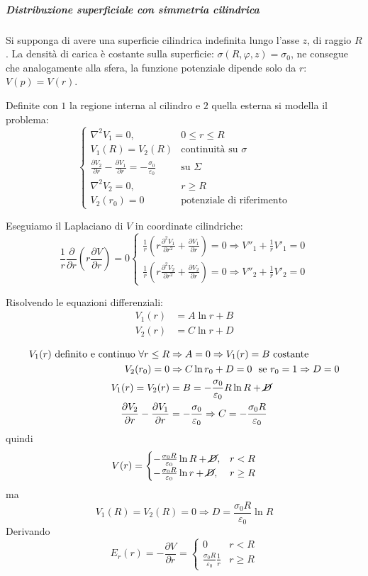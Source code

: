 \newpage
\subparagraph{Distribuzione superficiale con simmetria cilindrica}
Si supponga di avere una superficie cilindrica indefinita lungo l'asse $z$, di raggio $R$.
La densità di carica è costante sulla superficie: $\sigma(R,\varphi,z) = \sigma_0$, ne consegue che
analogamente alla sfera, la funzione potenziale dipende solo da $r$: $V(p)=V(r)$.

Definite con $1$ la regione interna al cilindro e $2$ quella esterna si modella il problema:
$$
\begin{cases}
\nabla^2 V_1 = 0, & 0\leq r\leq R\\
V_1(R) = V_2(R) & \text{continuità su }\sigma \\
\frac{\partial V_2}{\partial r} - \frac{\partial V_1}{\partial r} = -\frac{\sigma_0}{\varepsilon_0} & \text{su } \Sigma\\
\nabla^2 V_2 = 0, & r\geq R\\
V_2(r_0) = 0 & \text{potenziale di riferimento}
\end{cases}
$$

Eseguiamo il Laplaciano di $V$ in coordinate cilindriche:
$$
\frac{1}{r}\frac{\partial}{\partial r} \left(r\frac{\partial V}{\partial r}\right) = 0 \begin{cases}
\frac{1}{r}\left(r \frac{\partial^2 V_1}{\partial r^2} + 
\frac{\partial V_1}{\partial r}\right) = 0\Rightarrow V''_1 + 
\frac{1}{r}V'_1 = 0\\
\frac{1}{r}\left(r \frac{\partial^2 V_2}{\partial r^2} + 
\frac{\partial V_2}{\partial r}\right) = 0\Rightarrow V''_2 + 
\frac{1}{r}V'_2 = 0
\end{cases}
$$

Risolvendo le equazioni differenziali:
\begin{align*}
V_1(r) &= A \ln r + B\\
V_2(r) &= C \ln r + D
\end{align*}

\begin{align*}
V_1(r) \text{ definito e continuo } 
\forall r\leq R & \Rightarrow A = 0 \Rightarrow V_1(r) = B 
\text{ costante}\\
V_2(r_0) = 0 &\Rightarrow C\ln r_0 + D = 0\ \text{ se } r_0=1\Rightarrow D=0 \\
V_1(r) = V_2(r) &= B = -\frac{\sigma_0}{\varepsilon_0}R\ln R + \cancel{D}\\
\frac{\partial V_2}{\partial r} - \frac{\partial V_1}{\partial r} &= -\frac{\sigma_0}{\varepsilon_0}
\Rightarrow C = -\frac{\sigma_0 R}{\varepsilon_0}
\end{align*}
quindi
$$
V(r) = \begin{cases}
-\frac{\sigma_0 R}{\varepsilon_0} \ln R + \cancel{D},& r < R\\
-\frac{\sigma_0 R}{\varepsilon_0} \ln r + \cancel{D},& r \geq R
\end{cases}
$$
ma
$$
V_1(R) = V_2(R) = 0\Rightarrow D = \frac{\sigma_0 R}{\varepsilon_0} \ln R
$$
Derivando
$$
E_r (r) = -\frac{\partial V}{\partial r} = \begin{cases}
0 & r < R\\
\frac{\sigma_0 R}{\varepsilon_0}\frac{1}{r}& r\geq R
\end{cases}
$$

